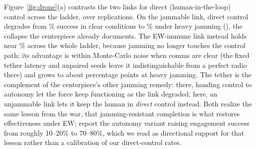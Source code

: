 \documentclass[11pt]{article}
\begin{document}
Figure~\ref{fig:drone}(a) contrasts the two links for direct (human-in-the-loop) control across the ladder, over \droneNRep{} replications. On the jammable link, direct control degrades from \fiberClearJam\% success in clear conditions to \fiberHeavyJam\% under heavy jamming (\fiberHeavyLabel{}), the collapse the centerpiece already documents. The EW-immune link instead holds near \fiberHeavyImm\% across the whole ladder, because jamming no longer touches the control path; its advantage is within Monte-Carlo noise when comms are clear (the fixed tether latency and unpaired seeds leave it indistinguishable from a perfect radio there) and grows to about \fiberHeavyGain{} percentage points at heavy jamming. The tether is the complement of the centerpiece's other jamming remedy: there, handing control to autonomy let the force keep functioning as the link degraded; here, an unjammable link lets it keep the human in \emph{direct} control instead. Both realize the same lesson from the war, that jamming-resistant completion is what restores effectiveness under EW; \citet{bondar2025autonomy} report the autonomy variant raising engagement success from roughly 10--20\% to 70--80\%, which we read as directional support for that lesson rather than a calibration of our direct-control rates.
\end{document}
